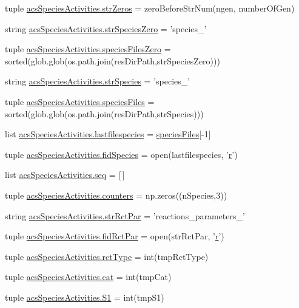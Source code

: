 \begin{DoxyCompactItemize}
\item 
tuple \hyperlink{a00097_ac53f52471f3cf1ef18465a07dc930dff}{acs\-Species\-Activities.\-str\-Zeros} = zero\-Before\-Str\-Num(ngen, number\-Of\-Gen)
\item 
string \hyperlink{a00097_a78927c369e0fe9deb29777c699af346f}{acs\-Species\-Activities.\-str\-Species\-Zero} = 'species\-\_\-'
\item 
tuple \hyperlink{a00097_a2f73b228eca2d5d0e45f781ccc21b253}{acs\-Species\-Activities.\-species\-Files\-Zero} = sorted(glob.\-glob(os.\-path.\-join(res\-Dir\-Path,str\-Species\-Zero)))
\item 
string \hyperlink{a00097_a7ad6c119fecb41b02823a95f334daa4c}{acs\-Species\-Activities.\-str\-Species} = 'species\-\_\-'
\item 
tuple \hyperlink{a00097_a7e3b3a6b0c9305e60758bf5d44e7b0f6}{acs\-Species\-Activities.\-species\-Files} = sorted(glob.\-glob(os.\-path.\-join(res\-Dir\-Path,str\-Species)))
\item 
list \hyperlink{a00097_ac7070acb2aaeb8965c57e81b6308ddd5}{acs\-Species\-Activities.\-lastfilespecies} = \hyperlink{a00022_af5703745c2c2a6af7f62da460994d9c2}{species\-Files}\mbox{[}-\/1\mbox{]}
\item 
tuple \hyperlink{a00097_a240d5b3cd72043528f4b674a8ba00a33}{acs\-Species\-Activities.\-fid\-Species} = open(lastfilespecies, '\hyperlink{a00025_ac862e7284527eb913b1351c8bfb8e079}{r}')
\item 
list \hyperlink{a00097_a50a8f7f4bae0fd037961d91206f5178c}{acs\-Species\-Activities.\-seq} = \mbox{[}$\,$\mbox{]}
\item 
tuple \hyperlink{a00097_a6afffdd046bbc3bc4fbee34b561fcae5}{acs\-Species\-Activities.\-counters} = np.\-zeros((n\-Species,3))
\item 
string \hyperlink{a00097_ab59af27efe5462ef13ae45fd7330d0b3}{acs\-Species\-Activities.\-str\-Rct\-Par} = 'reactions\-\_\-parameters\-\_\-'
\item 
tuple \hyperlink{a00097_a64247b23c199d0b0d0d60f02ec8682e3}{acs\-Species\-Activities.\-fid\-Rct\-Par} = open(str\-Rct\-Par, '\hyperlink{a00025_ac862e7284527eb913b1351c8bfb8e079}{r}')
\item 
tuple \hyperlink{a00097_abdc37f53b75138949fbbe9f9e42f1e6f}{acs\-Species\-Activities.\-rct\-Type} = int(tmp\-Rct\-Type)
\item 
tuple \hyperlink{a00097_a721a520fa04949579e29cb858dc00bf0}{acs\-Species\-Activities.\-cat} = int(tmp\-Cat)
\item 
tuple \hyperlink{a00097_a4ffac9566fa24baa2b27ccd97f9ffe1e}{acs\-Species\-Activities.\-S1} = int(tmp\-S1)

\end{DoxyCompactItemize}
